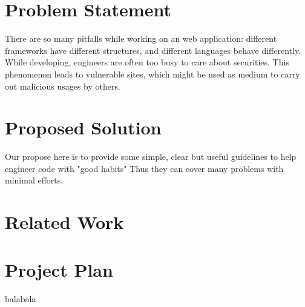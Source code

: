 \documentclass[12pt, a4paper]{article}
\begin{document}
%
%
\section{Problem Statement}
There are so many pitfalls while working on an web application:
different frameworks have different structures, and different languages behave
differently.
While developing,
engineers are often too busy to care about securities.
This phenomenon leads to vulnerable sites,
which might be used as medium to carry out malicious usages by others.

\section{Proposed Solution}
Our propose here is to provide some simple, clear but useful guidelines
to help engineer code with "good habits"
Thus they can cover many problems with minimal efforts.

%


\section{Related Work}
\section{Project Plan}
\begin{thebibliography}{9}
balabala
\end{thebibliography}
\end{document}
